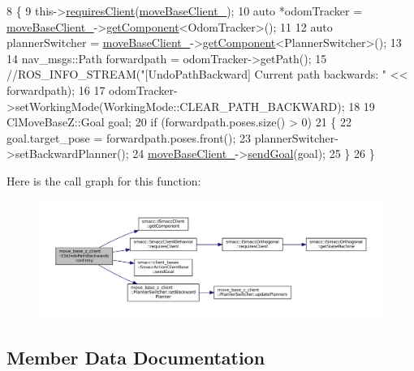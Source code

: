 \begin{DoxyCode}
8 \{
9     this->\hyperlink{classsmacc_1_1SmaccClientBehavior_a917f001e763a1059af337bf4e164f542}{requiresClient}(\hyperlink{classmove__base__z__client_1_1CbUndoPathBackwards_a19e7ace85698725a1d2730a7c6b3aa7d}{moveBaseClient\_});
10     \textcolor{keyword}{auto} *odomTracker = \hyperlink{classmove__base__z__client_1_1CbUndoPathBackwards_a19e7ace85698725a1d2730a7c6b3aa7d}{moveBaseClient\_}->\hyperlink{classsmacc_1_1ISmaccClient_adef78db601749ca63c19e74a27cb88cc}{getComponent}<OdomTracker>();
11 
12     \textcolor{keyword}{auto} plannerSwitcher = \hyperlink{classmove__base__z__client_1_1CbUndoPathBackwards_a19e7ace85698725a1d2730a7c6b3aa7d}{moveBaseClient\_}->\hyperlink{classsmacc_1_1ISmaccClient_adef78db601749ca63c19e74a27cb88cc}{getComponent}<PlannerSwitcher>();
13 
14     nav\_msgs::Path forwardpath = odomTracker->getPath();
15     \textcolor{comment}{//ROS\_INFO\_STREAM("[UndoPathBackward] Current path backwards: " << forwardpath);}
16 
17     odomTracker->setWorkingMode(WorkingMode::CLEAR\_PATH\_BACKWARD);
18 
19     ClMoveBaseZ::Goal goal;
20     \textcolor{keywordflow}{if} (forwardpath.poses.size() > 0)
21     \{
22         goal.target\_pose = forwardpath.poses.front();
23         plannerSwitcher->setBackwardPlanner();
24         \hyperlink{classmove__base__z__client_1_1CbUndoPathBackwards_a19e7ace85698725a1d2730a7c6b3aa7d}{moveBaseClient\_}->\hyperlink{classsmacc_1_1client__bases_1_1SmaccActionClientBase_a9c47a5094ac8afb01680307fe5eca922}{sendGoal}(goal);
25     \}
26 \}
\end{DoxyCode}
Here is the call graph for this function\+:
\nopagebreak
\begin{figure}[H]
\begin{center}
\leavevmode
\includegraphics[width=350pt]{classmove__base__z__client_1_1CbUndoPathBackwards_a2793c69857aa97337d56ff79dee20508_cgraph}
\end{center}
\end{figure}


\subsection{Member Data Documentation}
\mbox{\label{classmove__base__z__client_1_1CbUndoPathBackwards_a197e2034e873c09de896e7a8b6fe898f}} 
